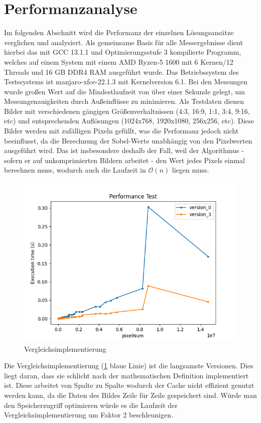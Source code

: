 \documentclass[course=erap]{aspdoc}
\begin{document}
\section{Performanzanalyse}\label{sec:performanzanalyse}
Im folgenden Abschnitt wird die Performanz der einzelnen Lösungsansätze verglichen und analysiert.
Als gemeinsame Basis für alle Messergebnisse dient hierbei das mit GCC 13.1.1 und Optimierungsstufe 3 kompilierte Programm, welches auf einem System mit einem AMD Ryzen-5 1600 mit 6 Kernen/12 Threads und 16 GB DDR4 RAM ausgeführt wurde.
Das Betriebssystem des Testssystems ist manjaro-xfce-22.1.3 mit Kernelversion 6.1.
Bei den Messungen wurde großen Wert auf die Mindestlaufzeit von über einer Sekunde gelegt, um Messungenauigkeiten durch Außeinflüsse zu minimieren.
Als Testdaten dienen Bilder mit verschiedenen gängigen Größenverhaltnissen (4:3, 16:9, 1:1, 3:4, 9:16, etc) und entsprechenden Auflösungen (1024x768, 1920x1080, 256x256, etc).
Diese Bilder werden mit zufälligen Pixeln gefüllt, was die Performanz jedoch nicht beeinflusst, da die Berechnung der Sobel-Werte unabhängig von den Pixelwerten ausgeführt wird.
Das ist insbesondere deshalb der Fall, weil der Algorithmus - sofern er auf unkomprimierten Bildern arbeitet - den Wert jedes Pixels einmal berechnen muss, wodurch auch die Laufzeit in $\mathcal{O}(n)$ liegen muss.

\begin{figure}[H]
    \centering
    \includegraphics[width=.75\columnwidth]{graphics/version_0_3.png}
    \caption{Vergleichsimplementierung}
    \label{fig:basic}
\end{figure}
Die Vergleichsimplementierung (\ref{fig:basic} blaue Linie) ist die langsamste Versionen. Dies liegt daran, dass sie schlicht nach der mathematischen Definition implementiert ist.
Diese arbeitet von Spalte zu Spalte wodurch der Cache nicht effizient genutzt werden kann, da die Daten des Bildes Zeile für Zeile gespeichert sind.
Würde man den Speicherzugriff optimieren würde es die Laufzeit der Vergleichsimplementierung um Faktor 2 beschleunigen.
\end{document}
